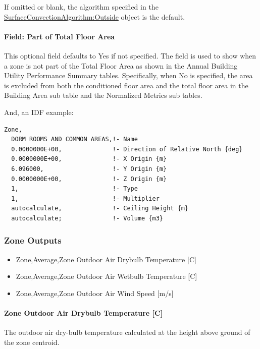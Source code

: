 If omitted or blank, the algorithm specified in the \hyperref[surfaceconvectionalgorithmoutside]{SurfaceConvectionAlgorithm:Outside} object is the default.

\paragraph{Field: Part of Total Floor Area}\label{field-part-of-total-floor-area}

This optional field defaults to Yes if not specified. The field is used to show when a zone is not part of the Total Floor Area as shown in the Annual Building Utility Performance Summary tables. Specifically, when No is specified, the area is excluded from both the conditioned floor area and the total floor area in the Building Area sub table and the Normalized Metrics sub tables.

And, an IDF example:

\begin{lstlisting}
Zone,
  DORM ROOMS AND COMMON AREAS,!- Name
  0.0000000E+00,              !- Direction of Relative North {deg}
  0.0000000E+00,              !- X Origin {m}
  6.096000,                   !- Y Origin {m}
  0.0000000E+00,              !- Z Origin {m}
  1,                          !- Type
  1,                          !- Multiplier
  autocalculate,              !- Ceiling Height {m}
  autocalculate;              !- Volume {m3}
\end{lstlisting}

\subsubsection{Zone Outputs}\label{outputs-037}

\begin{itemize}
\item
  Zone,Average,Zone Outdoor Air Drybulb Temperature {[}C{]}
\item
  Zone,Average,Zone Outdoor Air Wetbulb Temperature {[}C{]}
\item
  Zone,Average,Zone Outdoor Air Wind Speed {[}m/s{]}
\end{itemize}

\paragraph{Zone Outdoor Air Drybulb Temperature {[}C{]}}\label{zone-outdoor-air-drybulb-temperature-c-000}

The outdoor air dry-bulb temperature calculated at the height above ground of the zone centroid.

